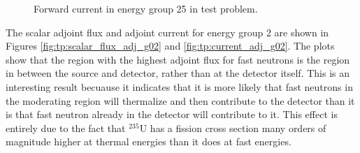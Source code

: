 \begin{figure}
\begin{minipage}{0.45\linewidth}
    \caption{Forward current in energy group 25 in test problem.}
    \label{fig:tp:current_fwd_g25}
  \end{minipage}
\end{figure}

The scalar adjoint flux and adjoint current for energy group 2 are shown in Figures \ref{fig:tp:scalar_flux_adj_g02} and \ref{fig:tp:current_adj_g02}.
The plots show that the region with the highest adjoint flux for fast neutrons is the region in between the source and detector, rather than at the detector itself.
This is an interesting result becuause it indicates that it is more likely that fast neutrons in the moderating region will thermalize and then contribute to the detector than it is that fast neutron already in the detector will contribute to it.
This effect is entirely due to the fact that ${}^{235}\text{U}$ has a fission cross section many orders of magnitude higher at thermal energies than it does at fast energies.

